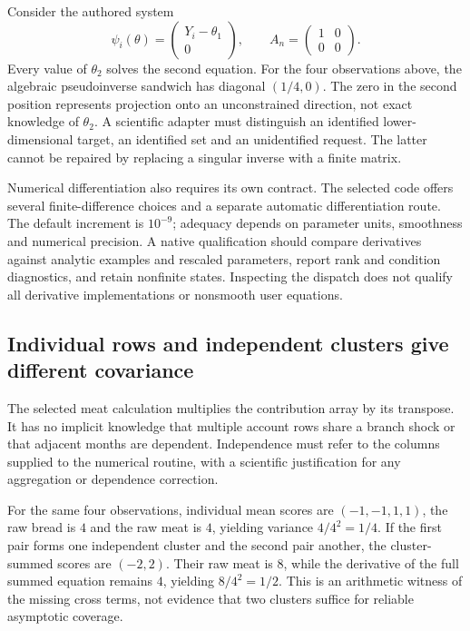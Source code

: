 Consider the authored system
\[
 \psi_i(\theta)=\begin{pmatrix}Y_i-\theta_1\\0\end{pmatrix},\qquad
 A_n=\begin{pmatrix}1&0\\0&0\end{pmatrix}.
\]
Every value of $\theta_2$ solves the second equation. For the four
observations above, the algebraic pseudoinverse sandwich has diagonal
$(1/4,0)$. The zero in the second position represents projection onto an
unconstrained direction, not exact knowledge of $\theta_2$. A scientific
adapter must distinguish an identified lower-dimensional target, an
identified set and an unidentified request. The latter cannot be repaired
by replacing a singular inverse with a finite matrix.
\citep{exec24_delicatessen_choice}

Numerical differentiation also requires its own contract. The selected
code offers several finite-difference choices and a separate automatic
differentiation route. The default increment is $10^{-9}$; adequacy
depends on parameter units, smoothness and numerical precision. A native
qualification should compare derivatives against analytic examples and
rescaled parameters, report rank and condition diagnostics, and retain
nonfinite states. Inspecting the dispatch does not qualify all derivative
implementations or nonsmooth user equations.\citep{exec24_delicatessen_source,exec24_delicatessen_choice}

\subsection{Individual rows and independent clusters give different covariance}
The selected meat calculation multiplies the contribution array by its
transpose. It has no implicit knowledge that multiple account rows share
a branch shock or that adjacent months are dependent. Independence must
refer to the columns supplied to the numerical routine, with a scientific
justification for any aggregation or dependence correction.
\citep{exec24_delicatessen_source}

For the same four observations, individual mean scores are
$(-1,-1,1,1)$, the raw bread is $4$ and the raw meat is $4$, yielding
variance $4/4^2=1/4$. If the first pair forms one independent cluster
and the second pair another, the cluster-summed scores are $(-2,2)$.
Their raw meat is $8$, while the derivative of the full summed equation
remains $4$, yielding $8/4^2=1/2$. This is an arithmetic witness of the
missing cross terms, not evidence that two clusters suffice for reliable
asymptotic coverage.\citep{exec24_delicatessen_choice}

